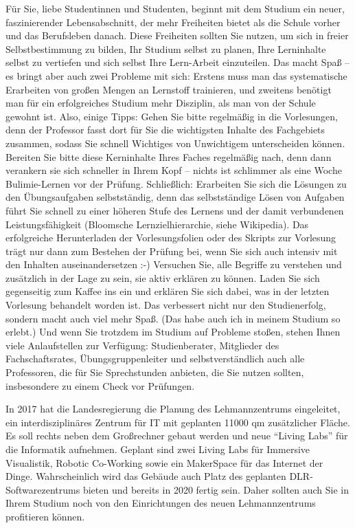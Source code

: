 {Für Sie, liebe Studentinnen und Studenten, beginnt mit dem Studium ein neuer, faszinierender Lebensabschnitt, der mehr Freiheiten bietet als die Schule vorher und das Berufsleben danach. Diese Freiheiten sollten Sie nutzen, um sich in freier Selbstbestimmung zu bilden, Ihr Studium selbst zu planen, Ihre Lerninhalte selbst zu vertiefen und sich selbst Ihre Lern-Arbeit einzuteilen. Das macht Spaß -- es bringt aber auch zwei Probleme mit sich: Erstens muss man das systematische Erarbeiten von großen Mengen an Lernstoff trainieren, und zweitens benötigt man für ein erfolgreiches Studium mehr Disziplin, als man von der Schule gewohnt ist. Also, einige Tipps: Gehen Sie bitte regelmäßig in die Vorlesungen, denn der Professor fasst dort für Sie die wichtigsten Inhalte des Fachgebiets zusammen, sodass Sie schnell Wichtiges von Unwichtigem unterscheiden können. Bereiten Sie bitte diese Kerninhalte Ihres Faches regelmäßig nach, denn dann verankern sie sich schneller in Ihrem Kopf -- nichts ist schlimmer als eine Woche Bulimie-Lernen vor der Prüfung. Schließlich: Erarbeiten Sie sich die Lösungen zu den Übungsaufgaben selbstständig, denn das selbstständige Lösen von Aufgaben führt Sie schnell zu einer höheren Stufe des Lernens und der damit verbundenen Leistungsfähigkeit (Bloomsche Lernzielhierarchie, siehe Wikipedia). Das erfolgreiche Herunterladen der Vorlesungsfolien oder des Skripts zur Vorlesung trägt nur dann zum Bestehen der Prüfung bei, wenn Sie sich auch intensiv mit den Inhalten auseinandersetzen :-) Versuchen Sie, alle Begriffe zu verstehen und zusätzlich in der Lage zu sein, sie aktiv erklären zu können. Laden Sie sich gegenseitig zum Kaffee ins \ascii{} ein und erklären Sie sich dabei, was in der letzten Vorlesung behandelt worden ist.  Das verbessert nicht nur den Studienerfolg, sondern macht auch viel mehr Spaß. (Das habe auch ich in meinem Studium so erlebt.) Und wenn Sie trotzdem im Studium auf Probleme stoßen, stehen Ihnen viele Anlaufstellen zur Verfügung: Studienberater, Mitglieder des Fachschaftsrates, Übungsgruppenleiter und selbstverständlich auch alle Professoren, die für Sie Sprechstunden anbieten, die Sie nutzen sollten, insbesondere zu einem Check vor Prüfungen.

In 2017 hat die Landesregierung die Planung des Lehmannzentrums eingeleitet, ein interdisziplinäres Zentrum für IT mit geplanten 11000 qm zusätzlicher Fläche. Es soll rechts neben dem Großrechner gebaut werden und neue \enquote{Living Labs} für die Informatik aufnehmen. Geplant sind zwei Living Labs für Immersive Visualistik, Robotic Co-Working sowie ein MakerSpace für das Internet der Dinge. Wahrscheinlich wird das Gebäude auch Platz des geplanten DLR-Softwarezentrums bieten und bereits in 2020 fertig sein. Daher sollten auch Sie in Ihrem Studium noch von den Einrichtungen des neuen Lehmannzentrums profitieren können.

}
